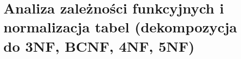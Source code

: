\section{Analiza zależności funkcyjnych i normalizacja tabel (dekompozycja do 3NF, BCNF, 4NF, 5NF)}
